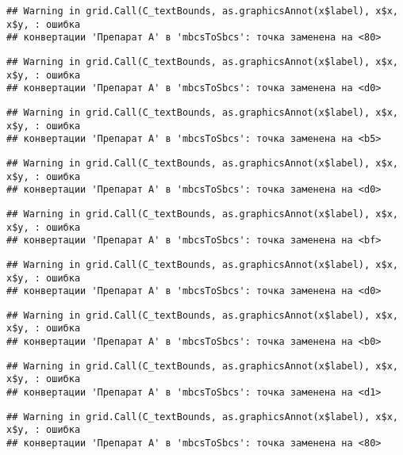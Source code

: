 \documentclass[
]{article}
\begin{document}
\begin{verbatim}
## Warning in grid.Call(C_textBounds, as.graphicsAnnot(x$label), x$x, x$y, : ошибка
## конвертации 'Препарат A' в 'mbcsToSbcs': точка заменена на <80>
\end{verbatim}

\begin{verbatim}
## Warning in grid.Call(C_textBounds, as.graphicsAnnot(x$label), x$x, x$y, : ошибка
## конвертации 'Препарат A' в 'mbcsToSbcs': точка заменена на <d0>
\end{verbatim}

\begin{verbatim}
## Warning in grid.Call(C_textBounds, as.graphicsAnnot(x$label), x$x, x$y, : ошибка
## конвертации 'Препарат A' в 'mbcsToSbcs': точка заменена на <b5>
\end{verbatim}

\begin{verbatim}
## Warning in grid.Call(C_textBounds, as.graphicsAnnot(x$label), x$x, x$y, : ошибка
## конвертации 'Препарат A' в 'mbcsToSbcs': точка заменена на <d0>
\end{verbatim}

\begin{verbatim}
## Warning in grid.Call(C_textBounds, as.graphicsAnnot(x$label), x$x, x$y, : ошибка
## конвертации 'Препарат A' в 'mbcsToSbcs': точка заменена на <bf>
\end{verbatim}

\begin{verbatim}
## Warning in grid.Call(C_textBounds, as.graphicsAnnot(x$label), x$x, x$y, : ошибка
## конвертации 'Препарат A' в 'mbcsToSbcs': точка заменена на <d0>
\end{verbatim}

\begin{verbatim}
## Warning in grid.Call(C_textBounds, as.graphicsAnnot(x$label), x$x, x$y, : ошибка
## конвертации 'Препарат A' в 'mbcsToSbcs': точка заменена на <b0>
\end{verbatim}

\begin{verbatim}
## Warning in grid.Call(C_textBounds, as.graphicsAnnot(x$label), x$x, x$y, : ошибка
## конвертации 'Препарат A' в 'mbcsToSbcs': точка заменена на <d1>
\end{verbatim}

\begin{verbatim}
## Warning in grid.Call(C_textBounds, as.graphicsAnnot(x$label), x$x, x$y, : ошибка
## конвертации 'Препарат A' в 'mbcsToSbcs': точка заменена на <80>
\end{verbatim}
\end{document}
